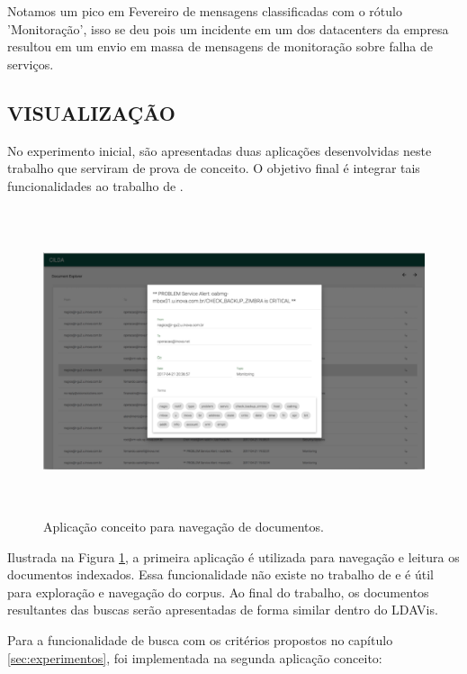 \documentclass[12pt,a4paper]{article}
\begin{document}
Notamos um pico em Fevereiro de mensagens classificadas
 com o rótulo 'Monitoração', isso se deu pois um incidente em um dos datacenters da empresa resultou em
 um envio em massa de mensagens de monitoração sobre falha de serviços.

\subsection{VISUALIZAÇÃO} \label{sec:visualizacao}

No experimento inicial, são apresentadas duas aplicações desenvolvidas neste trabalho que serviram de prova de conceito.
 O objetivo final é integrar tais funcionalidades ao trabalho de .

\begin{figure}[H]
  \centering
  \includegraphics[height=9cm]{images/figure_8.png}
  \caption{Aplicação conceito para navegação de documentos.}
  \label{fig-doc-explorer}
\end{figure}

Ilustrada na Figura \ref{fig-doc-explorer}, a primeira aplicação é utilizada para navegação e leitura os documentos
 indexados. Essa funcionalidade não existe no trabalho de  e é útil para exploração e navegação do corpus.
 Ao final do trabalho, os documentos resultantes das buscas serão apresentadas de forma similar dentro do LDAVis. 

Para a funcionalidade de busca com os critérios propostos no capítulo \ref{sec:experimentos}, foi implementada na segunda aplicação conceito:
\end{document}
